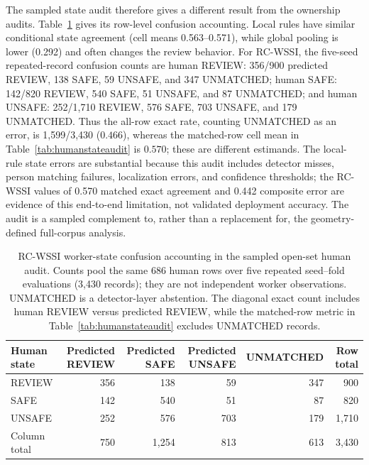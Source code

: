 \documentclass[iicol,pdflatex,sn-mathphys-num]{sn-jnl}
\begin{document}
The sampled state audit therefore gives a different result from the ownership audits. Table~\ref{tab:humanstateconfusion} gives its row-level confusion accounting. Local rules have similar conditional state agreement (cell means 0.563--0.571), while global pooling is lower (0.292) and often changes the review behavior. For RC-WSSI, the five-seed repeated-record confusion counts are human REVIEW: 356/900 predicted REVIEW, 138 SAFE, 59 UNSAFE, and 347 UNMATCHED; human SAFE: 142/820 REVIEW, 540 SAFE, 51 UNSAFE, and 87 UNMATCHED; and human UNSAFE: 252/1,710 REVIEW, 576 SAFE, 703 UNSAFE, and 179 UNMATCHED. Thus the all-row exact rate, counting UNMATCHED as an error, is 1,599/3,430 ($0.466$), whereas the matched-row cell mean in Table~\ref{tab:humanstateaudit} is $0.570$; these are different estimands. The local-rule state errors are substantial because this audit includes detector misses, person matching failures, localization errors, and confidence thresholds; the RC-WSSI values of 0.570 matched exact agreement and 0.442 composite error are evidence of this end-to-end limitation, not validated deployment accuracy. The audit is a sampled complement to, rather than a replacement for, the geometry-defined full-corpus analysis.

\begin{table}[t]
\caption{RC-WSSI worker-state confusion accounting in the sampled open-set human audit. Counts pool the same 686 human rows over five repeated seed--fold evaluations (3,430 records); they are not independent worker observations. UNMATCHED is a detector-layer abstention. The diagonal exact count includes human REVIEW versus predicted REVIEW, while the matched-row metric in Table~\ref{tab:humanstateaudit} excludes UNMATCHED records.}
\label{tab:humanstateconfusion}
\centering
\scriptsize
\setlength{\tabcolsep}{5pt}
\begin{tabular}{@{}l r r r r r@{}}
\toprule
Human state & Predicted REVIEW & Predicted SAFE & Predicted UNSAFE & UNMATCHED & Row total \\
\midrule
REVIEW & 356 & 138 & 59 & 347 & 900 \\
SAFE & 142 & 540 & 51 & 87 & 820 \\
UNSAFE & 252 & 576 & 703 & 179 & 1,710 \\
\midrule
Column total & 750 & 1,254 & 813 & 613 & 3,430 \\
\bottomrule
\end{tabular}
\end{table}
\end{document}
